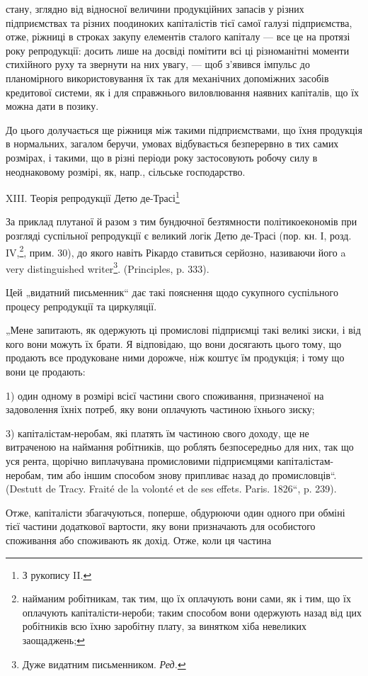 \parcont{}  %
стану, зглядно від відносної величини продукційних запасів у різних
підприємствах та різних поодиноких капіталістів тієї самої галузі підприємства,
отже, ріжниці в строках закупу елементів сталого капіталу —
все це на протязі року репродукції: досить лише на досвіді помітити
всі ці різноманітні моменти стихійного руху та звернути на них увагу, —
щоб з’явився імпульс до планомірного використовування їх так для механічних
допоміжних засобів кредитової системи, як і для справжнього
виловлювання наявних капіталів, що їх можна дати в позику.

До цього долучається ще ріжниця між такими підприємствами, що
їхня продукція в нормальних, загалом беручи, умовах відбувається
безперервно в тих самих розмірах, і такими, що в різні періоди року
застосовують робочу силу в неоднаковому розмірі, як, напр., сільське
господарство.

XIII. Теорія репродукції Детю де-Трасі\footnote{
З рукопису II.
}

За приклад плутаної й разом з тим бундючної безтямности політикоекономів
при розгляді суспільної репродукції є великий логік Детю
де-Трасі (пор. кн. І, розд. IV,\footnote{
найманим робітникам, так тим, що їх оплачують вони сами, як і
тим, що їх оплачують капіталісти-нероби; таким способом вони одержують
назад від цих робітників всю їхню заробітну плату, за винятком хіба невеликих
заощаджень;
}, прим. 30), до якого навіть Рікардо
ставиться серйозно, називаючи його a very distinguished writer\footnote*{
Дуже видатним письменником. \emph{Ред.}
}. (Principles,
p. 333).

Цей „видатний письменник“ дає такі пояснення щодо сукупного суспільного
процесу репродукції та циркуляції.

„Мене запитають, як одержують ці промислові підприємці такі великі
зиски, і від кого вони можуть їх брати. Я відповідаю, що вони досягають
цього тому, що продають все продуковане ними дорожче, ніж коштує
їм продукція; і тому що вони це продають:

1) один одному в розмірі всієї частини свого споживання, призначеної
на задоволення їхніх потреб, яку вони оплачують частиною їхнього
зиску;

3) капіталістам-неробам, які платять їм частиною свого доходу, ще
не витраченою на наймання робітників, що роблять безпосередньо для
них, так що уся рента, щорічно виплачувана промисловими підприємцями
капіталістам-неробам, тим або іншим способом знову припливає
назад до промисловців“. (Destutt de Tracy. Fraité de la volonté et de ses
effets. Paris. 1826“, p. 239).

Отже, капіталісти збагачуються, поперше, обдурюючи один одного при
обміні тієї частини додаткової вартости, яку вони призначають для особистого
споживання або споживають як дохід. Отже, коли ця частина
\parbreak{}  %
